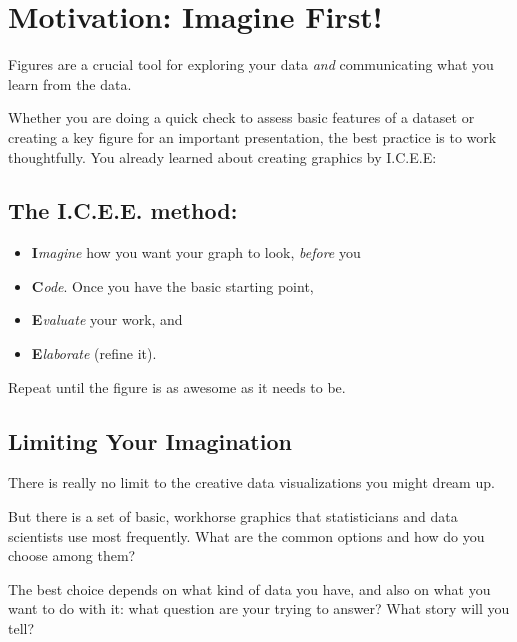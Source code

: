 \documentclass[
  letterpaper,
  DIV=11,
  numbers=noendperiod]{scrreprt}
\providecommand{\tightlist}{%
  \setlength{\itemsep}{0pt}\setlength{\parskip}{0pt}}\usepackage{longtable,booktabs,array}
\theoremstyle{remark}
\begin{document}
\section*{Motivation: Imagine First!}\label{motivation-imagine-first-1}


Figures are a crucial tool for exploring your data \emph{and}
communicating what you learn from the data.

Whether you are doing a quick check to assess basic features of a
dataset or creating a key figure for an important presentation, the best
practice is to work thoughtfully. You already learned about creating
graphics by I.C.E.E:

\subsection*{\texorpdfstring{The \textbf{I.C.E.E.
method}:}{The I.C.E.E. method:}}\label{the-i.c.e.e.-method-1}

\begin{itemize}
\tightlist
\item
  \textbf{I}\emph{magine} how you want your graph to look, \emph{before}
  you
\item
  \textbf{C}\emph{ode}. Once you have the basic starting point,
\item
  \textbf{E}\emph{valuate} your work, and
\item
  \textbf{E}\emph{laborate} (refine it).
\end{itemize}

Repeat until the figure is as awesome as it needs to be.

\subsection*{Limiting Your Imagination}\label{limiting-your-imagination}

There is really no limit to the creative data visualizations you might
dream up.

But there is a set of basic, workhorse graphics that statisticians and
data scientists use most frequently. What are the common options and how
do you choose among them?

The best choice depends on what kind of data you have, and also on what
you want to do with it: what question are your trying to answer? What
story will you tell?
\end{document}

